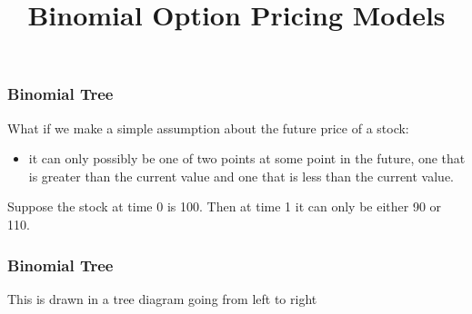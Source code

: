 \documentclass{beamer}
\title{Binomial Option Pricing Models}
\author{}
\date{}
\theoremstyle{plain}
\theoremstyle{definition}
\theoremstyle{remark}
\begin{document}
\maketitle

\begin{frame}
\frametitle{Binomial Tree}

What if we make a simple assumption about the future price of a stock:
\begin{itemize}
\item
 it can only possibly be one of two points at some point in the future, one that is  greater than the current value and one that is less than the current value. 
 \end{itemize}
 \vspace{1cm}

 Suppose the stock at time 0 is 100. Then at time 1 it can only be either 90 or 110.

\end{frame}

\begin{frame}
\frametitle{Binomial Tree}

This is drawn in a tree diagram going from left to right


\end{frame}
\end{document}
